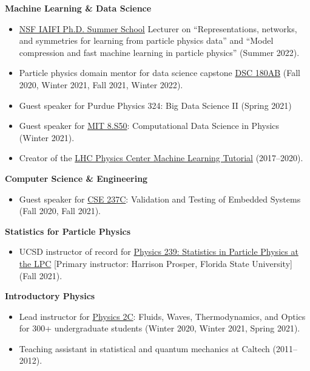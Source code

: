 \documentclass[11pt]{res}
\begin{document}
\begin{resume}
  \textbf{Machine Learning \& Data Science}
  \begin{itemize}
    \itemsep-0.3em
    \item \href{https://iaifi.org/phd-summer-school.html}{NSF IAIFI Ph.D. Summer School} Lecturer on ``Representations, networks, and symmetries for learning from particle physics data'' and ``Model compression and fast machine learning in particle physics'' (Summer 2022).
    \item Particle physics domain mentor for data science capstone \href{https://jmduarte.github.io/capstone-particle-physics-domain}{DSC 180AB} ({Fall 2020, Winter 2021, Fall 2021, Winter 2022}).
    \item Guest speaker for Purdue Physics 324: Big Data Science II ({Spring 2021})
    \item Guest speaker for \href{https://github.com/violatingcp/MIT_8.S50}{MIT 8.S50}: Computational Data Science in Physics ({Winter 2021}).
    \item Creator of the \href{https://github.com/FNALLPC/machine-learning-hats}{LHC Physics Center Machine Learning Tutorial} ({2017--2020}).
  \end{itemize}

  \textbf{Computer Science \& Engineering}
  \begin{itemize}
    \itemsep-0.3em
    \item Guest speaker for \href{http://kastner.ucsd.edu/ryan/cse237c/}{CSE 237C}: Validation and Testing of Embedded Systems ({Fall 2020, Fall 2021}).
  \end{itemize}

  \textbf{Statistics for Particle Physics}
  \begin{itemize}
    \itemsep-0.3em
    \item UCSD instructor of record for \href{https://indico.cern.ch/event/1066958/}{Physics 239: Statistics in Particle Physics at the LPC} [Primary instructor: Harrison Prosper, Florida State University] ({Fall 2021}).
  \end{itemize}

  \textbf{Introductory Physics}
  \begin{itemize}
    \itemsep-0.3em
    \item Lead instructor for \href{https://jduarte.physics.ucsd.edu/phys2c/index.html}{Physics 2C}: Fluids, Waves, Thermodynamics, and Optics for 300+ undergraduate students ({Winter 2020, Winter 2021, Spring 2021}).
    \item Teaching assistant in statistical and quantum mechanics at Caltech ({2011--2012}).
  \end{itemize}


\end{resume}
\end{document}
